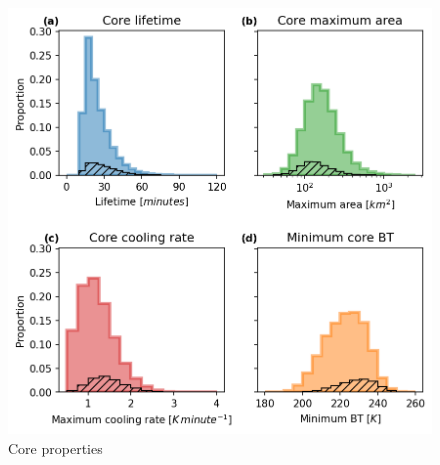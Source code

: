 \begin{figure}[tp]
    \centering
    \includegraphics[width=\textwidth]{figures/ch2_09.png}
    \caption{Core properties}
    \label{fig:core_properties}
\end{figure}

